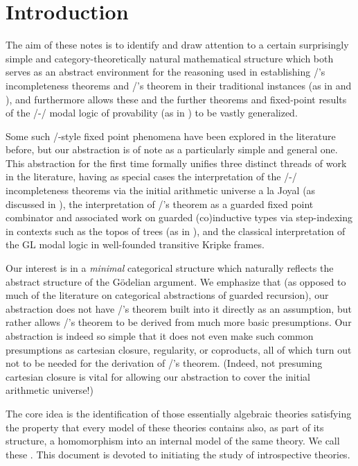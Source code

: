\filestart

\section{Introduction}
The aim of these notes is to identify and draw attention to a certain surprisingly simple and category-theoretically natural mathematical structure which both serves as an abstract environment for the reasoning used in establishing \Goedel/'s incompleteness theorems and \Loeb/'s theorem in their traditional instances (as in \autocite{goedel1931formal} and \autocite{loeb1955solution}), and furthermore allows these and the further theorems and fixed-point results of the \Goedel/-\Loeb/ modal logic of provability (as in \autocite{boolos1995logic}) to be vastly generalized.

Some such \Loeb/-style fixed point phenomena have been explored in the literature before, but our abstraction is of note as a particularly simple and general one. This abstraction for the first time formally unifies three distinct threads of work in the literature, having as special cases the interpretation of the \Goedel/-\Loeb/ incompleteness theorems via the initial arithmetic universe a la Joyal (as discussed in \autocite{van2020g}), the interpretation of \Loeb/'s theorem as a guarded fixed point combinator and associated work on guarded (co)inductive types via step-indexing in contexts such as the topos of trees (as in \autocite{birkedal2011first}), and the classical interpretation of the GL modal logic in well-founded transitive Kripke frames.

Our interest is in a \emph{minimal} categorical structure which naturally reflects the abstract structure of the G\"odelian argument. We emphasize that (as opposed to much of the literature on categorical abstractions of guarded recursion), our abstraction does not have \Loeb/'s theorem built into it directly as an assumption, but rather allows \Loeb/'s theorem to be derived from much more basic presumptions. Our abstraction is indeed so simple that it does not even make such common presumptions as cartesian closure, regularity, or coproducts, all of which turn out not to be needed for the derivation of \Loeb/'s theorem. (Indeed, not presuming cartesian closure is vital for allowing our abstraction to cover the initial arithmetic universe!)

The core idea is the identification of those essentially algebraic theories satisfying the property that every model of these theories contains also, as part of its structure, a homomorphism into an internal model of the same theory. We call these . This document is devoted to initiating the study of introspective theories.

